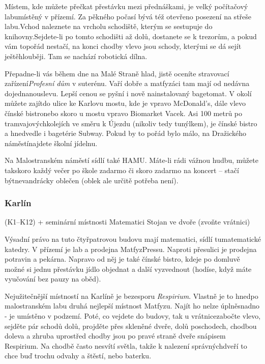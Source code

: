 Místem, kde můžete přečkat přestávku mezi přednáškami, je velký počítačový
labumístěný v přízemí. Za pěkného počasí bývá též otevřeno posezení na střeše
labu.Vchod naleznete na vrcholu schodiště, kterým se sestupuje do
knihovny.Sejdete-li po tomto schodišti až dolů, dostanete se k trezorům, a pokud
vám topořád nestačí, na konci chodby vlevo jsou schody, kterými se dá sejít
ještěhlouběji. Tam se nachází robotická dílna.

Přepadne-li vás během dne na Malé Straně hlad, jistě oceníte stravovací
zařízení\textit{Profesní dům} v suterénu. Vaří dobře a matfyzáci tam mají od
nedávna dojednanouslevu. Lepší cenou se pyšní i nově nainstalovaný bagetomat. V
okolí můžete zajítdo ulice ke Karlovu mostu, kde je vpravo McDonald's, dále
vlevo čínské bistronebo skoro u mostu vpravo Biomarket Vacek. Asi 100 metrů po
tramvajovýchkolejích ve směru k Újezdu (nikoliv tedy tunýlkem), je čínské bistro
a hnedvedle i bagetérie Subway. Pokud by to pořád bylo málo, na Dražického
náměstínajdete školní jídelnu.

Na Malostranském náměstí sídlí také HAMU. Máte-li rádi vážnou hudbu, můžete
takskoro každý večer po škole zadarmo či skoro zadarmo na koncert – stačí
býtnevandrácky oblečen (oblek ale určitě potřeba není).


\subsubsection{Karlín}

{ (K1--K12) + seminární místnosti}
{Matematici}
{Stojan ve dvoře (zvoňte vrátnici)}

\noindent Výsadní právo na tuto čtyřpatrovou budovu mají matematici, sídlí
tumatematické katedry. V přízemí je lab a prodejna MatfyzPressu. Naproti
přesulici je prodejna potravin a pekárna. Napravo od něj je také čínské bistro,
kdeje po domluvě možné si jednu přestávku jídlo objednat a další vyzvednout
(hodíse, když máte vyučování bez pauzy na oběd).

Nejužitečnější místností na Karlíně je bezesporu \textit{Respirium}. Vlastně je
to hnedpo malostranském labu druhá nejlepší místnost Matfyzu. Najít ho nelze
úplněsnadno - je umístěno v podzemí. Poté, co vejdete do budovy, tak u
vrátnicezabočte vlevo, sejděte pár schodů dolů, projděte přes skleněné dveře,
dolů poschodech, chodbou doleva a zhruba uprostřed chodby jsou po pravé straně
dveře snápisem Respirium. Na chodbě často nesvítí světla, takže k nalezení
správnýchdveří to chce buď trochu odvahy a štěstí, nebo baterku.

